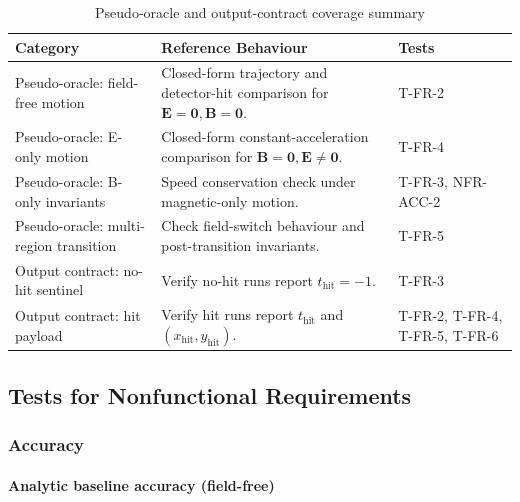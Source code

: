 \documentclass[12pt, titlepage]{article}
\providecommand{\wss}[1]{}
\begin{document}
\begin{table}[h!]
\centering
\renewcommand{\arraystretch}{1.15}
\begin{tabularx}{\textwidth}{p{3.8cm}p{6.2cm}X}
\toprule
\textbf{Category} & \textbf{Reference Behaviour} & \textbf{Tests} \\
\midrule
Pseudo-oracle: field-free motion & Closed-form trajectory and detector-hit comparison for $\mathbf{E}=\mathbf{0},\mathbf{B}=\mathbf{0}$. & T-FR-2 \\
Pseudo-oracle: E-only motion & Closed-form constant-acceleration comparison for $\mathbf{B}=\mathbf{0},\mathbf{E}\neq\mathbf{0}$. & T-FR-4 \\
Pseudo-oracle: B-only invariants & Speed conservation check under magnetic-only motion. & T-FR-3, NFR-ACC-2 \\
Pseudo-oracle: multi-region transition & Check field-switch behaviour and post-transition invariants. & T-FR-5 \\
Output contract: no-hit sentinel & Verify no-hit runs report $t_{\mathrm{hit}}=-1$. & T-FR-3 \\
Output contract: hit payload & Verify hit runs report $t_{\mathrm{hit}}$ and $(x_{\mathrm{hit}},y_{\mathrm{hit}})$. & T-FR-2, T-FR-4, T-FR-5, T-FR-6 \\
\bottomrule
\end{tabularx}
\caption{Pseudo-oracle and output-contract coverage summary}
\label{tab:pseudo_oracle_coverage}
\end{table}

\wss{It would be nice to have a blurb here to explain why the subsections below
  cover the requirements.  References to the SRS would be good here.  If a section
  covers tests for input constraints, you should reference the data constraints
  table in the SRS.}


\subsection{Tests for Nonfunctional Requirements}

\subsubsection{Accuracy}

\paragraph{Analytic baseline accuracy (field-free)}
\end{document}
